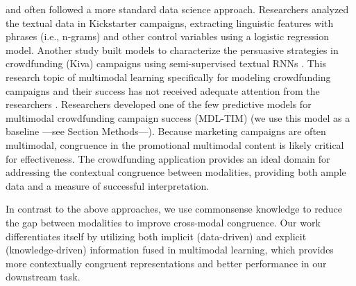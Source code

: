 and often followed a more standard data science approach. 
Researchers \cite{Mitra2014-ly} analyzed the textual data in Kickstarter campaigns, extracting linguistic features with phrases (i.e., n-grams) and other control variables using a logistic regression model. 
Another study built models to characterize the persuasive strategies in crowdfunding (Kiva) campaigns using semi-supervised textual RNNs \cite{yang2019let}. This research topic of multimodal learning
specifically for modeling crowdfunding campaigns and their success has not received adequate attention from the researchers \cite{Palmieri2022-ch,Carradini2023-ka}. Researchers \cite{cheng2019success} developed one of the few predictive models for multimodal crowdfunding campaign success (MDL-TIM) (we use this model as a baseline ---see Section Methods---). 
Because marketing campaigns are often multimodal, congruence in the promotional multimodal content is likely critical for effectiveness. The crowdfunding application provides an ideal domain for addressing the contextual congruence between modalities, providing both ample data and a measure of successful interpretation.

In contrast to the above approaches, we use commonsense knowledge to reduce the gap between modalities to 
improve cross-modal congruence. Our work differentiates itself by utilizing both implicit (data-driven) and explicit (knowledge-driven) information fused in multimodal learning, which provides more contextually congruent representations and better performance in our downstream task.
